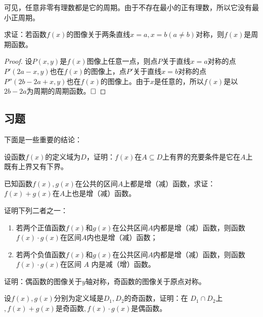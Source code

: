 \documentclass[lang=cn,math=cm,chinesefont=nofont,11pt,scheme=chinese,onecol]{elegantbook}
\begin{document}
可见，任意非零有理数都是它的周期。由于不存在最小的正有理数，所以它没有最小正周期。

\begin{example}
  求证：若函数$f(x)$的图像关于两条直线$x=a,x=b(a\neq b)$对称，则$f(x)$是周期函数。
\end{example}

\begin{proof}
  设$P(x,y)$是$f(x)$图像上任意一点，则点$P$关于直线$x=a$对称的点$P'(2a-x,y)$也在$f(x)$的图像上，点$P'$关于直线$x=b$对称的点$P''(2b-2a+x,y)$也在$f(x)$的图像上。由于$x$是任意的，所以$f(x)$是以$2b-2a$为周期的周期函数。$\hfill\square$
\end{proof}

\subsection{习题}

下面是一些重要的结论：

\begin{exercise}
  设函数$f(x)$的定义域为$D$，证明：$f(x)$在$A\subseteq D$上有界的充要条件是它在$A$上既有上界又有下界。
\end{exercise}

\begin{exercise}
  已知函数$f(x),g(x)$在公共的区间$A$上都是增（减）函数，求证：$f(x)+g(x)$在$A$上也是增（减）函数。
\end{exercise}

\begin{exercise}
  证明下列二者之一：
\end{exercise}

\begin{enumerate}
  \item 若两个正值函数$f(x)$和$g(x)$在公共区间$A$内都是增（减）函数，则函数$f(x)\cdot g(x)$在区间$A$内也是增（减）函数；
  \item 若两个负值函数$f(x)$和$g(x)$在公共区间$A$内都是增（减）函数，则函数$f(x)\cdot g(x)$在区间 $A$ 内是减（增）函数。
\end{enumerate}

\begin{exercise}
  证明：偶函数的图像关于$y$轴对称，奇函数的图像关于原点对称。
\end{exercise}

\begin{exercise}
  设$f(x),g(x)$分别为定义域是$D_1,D_2$的奇函数，证明：在 $D_1\cap D_2$上$,f(x)+g(x)$是奇函数$,f(x)\cdot g(x)$是偶函数。
\end{exercise}
\end{document}
